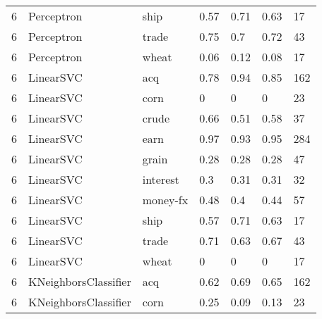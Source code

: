 \documentclass{article}
\begin{document}
\begin{table}[h]
\begin{tabular}{lllllll}
6             & Perceptron             & ship            & 0.57               & 0.71            & 0.63              & 17               \\
6             & Perceptron             & trade           & 0.75               & 0.7             & 0.72              & 43               \\
6             & Perceptron             & wheat           & 0.06               & 0.12            & 0.08              & 17               \\
6             & LinearSVC              & acq             & 0.78               & 0.94            & 0.85              & 162              \\
6             & LinearSVC              & corn            & 0                  & 0               & 0                 & 23               \\
6             & LinearSVC              & crude           & 0.66               & 0.51            & 0.58              & 37               \\
6             & LinearSVC              & earn            & 0.97               & 0.93            & 0.95              & 284              \\
6             & LinearSVC              & grain           & 0.28               & 0.28            & 0.28              & 47               \\
6             & LinearSVC              & interest        & 0.3                & 0.31            & 0.31              & 32               \\
6             & LinearSVC              & money-fx        & 0.48               & 0.4             & 0.44              & 57               \\
6             & LinearSVC              & ship            & 0.57               & 0.71            & 0.63              & 17               \\
6             & LinearSVC              & trade           & 0.71               & 0.63            & 0.67              & 43               \\
6             & LinearSVC              & wheat           & 0                  & 0               & 0                 & 17               \\
6             & KNeighborsClassifier   & acq             & 0.62               & 0.69            & 0.65              & 162              \\
6             & KNeighborsClassifier   & corn            & 0.25               & 0.09            & 0.13              & 23               \\

\end{tabular}
\end{table}
\end{document}

